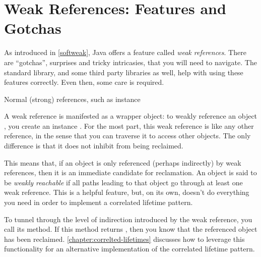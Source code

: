 \section{Weak References: Features and Gotchas}


As introduced in \autoref{softweak}, Java offers a feature called \emph{weak
references}. There are ``gotchas'', surprises and tricky intricasies, that you
will need to navigate. The standard library, and some third party libraries as
well, help with using these features correctly. Even then, some care is
required.

Normal (strong) references, such as  instance

A weak reference is manifested as a wrapper object: to weakly reference an
object , you create an instance . For the
most part, this weak reference is like any other reference, in the sense that
you can traverse it to access other objects. The only difference is that it does
not inhibit  from being reclaimed.

This means that, if an object is only referenced (perhaps indirectly) by weak
references, then it is an immediate candidate for reclamation. An object is said
to be \emph{weakly reachable} if all paths leading to that object go through at
least one weak reference. This is a helpful feature, but, on its own, doesn't do
everything you need in order to implement a correlated lifetime pattern.

To tunnel through the level of indirection introduced by the weak reference, you
call its  method. If this method returns , then you know
that the referenced object has been reclaimed.
\autoref{chapter:correlted-lifetimes} discusses how to leverage this
functionality for an alternative implementation of the correlated lifetime
pattern.

